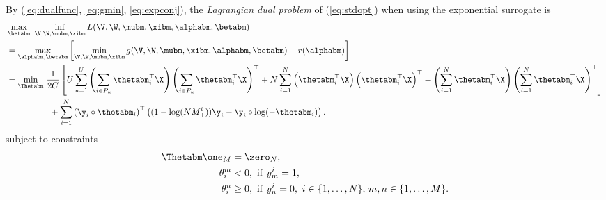 By (\ref{eq:dualfunc}, \ref{eq:gmin}, \ref{eq:expconj}), the \emph{Lagrangian dual problem} of (\ref{eq:stdopt}) when using the exponential surrogate is
\begin{equation*}
\begin{aligned}
&\max_{\betabm} \ \inf_{\V, \W, \mubm, \xibm} L(\V, \W, \mubm, \xibm, \alphabm, \betabm) \\
&= \max_{\alphabm, \betabm} \left[ \min_{\V, \W, \mubm, \xibm} g(\V, \W, \mubm, \xibm, \alphabm, \betabm) - r(\alphabm) \right] \\
&= \min_{\Thetabm} \, \frac{1}{2 C} \left[
     U \sum_{u=1}^U \left( \sum_{i \in P_u} \thetabm_i^\top \X \right) \left( \sum_{i \in P_u} \thetabm_i^\top \X \right)^\top
   + N \sum_{i=1}^N \left( \thetabm_i^\top \X \right) \left( \thetabm_i^\top \X \right)^\top
   + \left( \sum_{i=1}^N \thetabm_i^\top \X \right) \left( \sum_{i=1}^N \thetabm_i^\top \X \right)^\top \right] \\
& \hspace{5em}
   + \sum_{i=1}^N \left( \y_i \circ \thetabm_i \right)^\top 
     \left( (1 - \log(N M_+^i)) \y_i - \y_i \circ \log(-\thetabm_i) \right).
\end{aligned}
\end{equation*}
subject to constraints
\begin{equation*}
\begin{aligned}
\Thetabm \one_M &= \zero_N, \\
\theta_i^m & < 0, \ \mathrm{if} \ y_m^i = 1, \\
\theta_i^n & \ge 0, \ \mathrm{if} \ y_n^i = 0, \ i \in \{1,\dots,N\}, \, m,n \in \{1,\dots,M\}.
\end{aligned}
\end{equation*}


